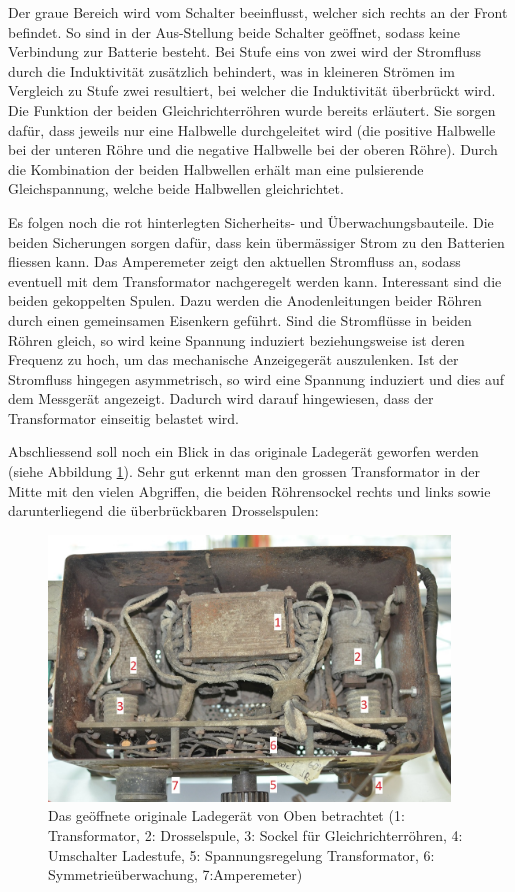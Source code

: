 Der graue Bereich wird vom Schalter beeinflusst, welcher sich rechts an der Front befindet. So sind in der Aus-Stellung beide Schalter geöffnet, sodass keine Verbindung zur Batterie besteht. Bei Stufe eins von zwei wird der Stromfluss durch die Induktivität zusätzlich behindert, was in kleineren Strömen im Vergleich zu Stufe zwei resultiert, bei welcher die Induktivität überbrückt wird. Die Funktion der beiden Gleichrichterröhren wurde bereits erläutert. Sie sorgen dafür, dass jeweils nur eine Halbwelle durchgeleitet wird (die positive Halbwelle bei der unteren Röhre und die negative Halbwelle bei der oberen Röhre). Durch die Kombination der beiden Halbwellen erhält man eine pulsierende Gleichspannung, welche beide Halbwellen gleichrichtet.

Es folgen noch die rot hinterlegten Sicherheits- und Überwachungsbauteile. Die beiden Sicherungen sorgen dafür, dass kein übermässiger Strom zu den Batterien fliessen kann. Das Amperemeter zeigt den aktuellen Stromfluss an, sodass eventuell mit dem Transformator nachgeregelt werden kann. Interessant sind die beiden gekoppelten Spulen. Dazu werden die Anodenleitungen beider Röhren durch einen gemeinsamen Eisenkern geführt. Sind die Stromflüsse in beiden Röhren gleich, so wird keine Spannung induziert beziehungsweise ist deren Frequenz zu hoch, um das mechanische Anzeigegerät auszulenken. Ist der Stromfluss hingegen asymmetrisch, so wird eine Spannung induziert und dies auf dem Messgerät angezeigt. Dadurch wird darauf hingewiesen, dass der Transformator einseitig belastet wird.

Abschliessend soll noch ein Blick in das originale Ladegerät geworfen werden (siehe Abbildung \ref{fig:Ladegeraet_Original}). Sehr gut erkennt man den grossen Transformator in der Mitte mit den vielen Abgriffen, die beiden Röhrensockel rechts und links sowie darunterliegend die überbrückbaren Drosselspulen:

\begin{figure}[h]
	\centering
		\includegraphics[width=0.95\textwidth]{images/Ladegeraet_Original.JPG}
	\caption{Das geöffnete originale Ladegerät von Oben betrachtet (1: Transformator, 2: Drosselspule, 3: Sockel für Gleichrichterröhren, 4: Umschalter Ladestufe, 5: Spannungsregelung Transformator, 6: Symmetrieüberwachung, 7:Amperemeter)}
	\label{fig:Ladegeraet_Original}
\end{figure}

\newpage